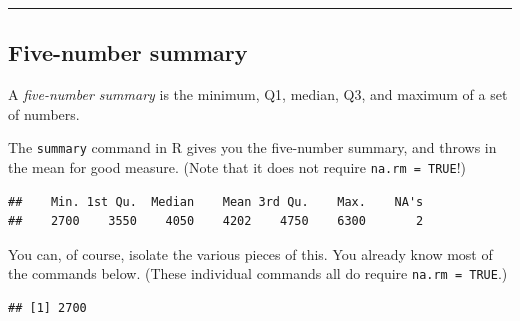 \documentclass[
]{book}
\newenvironment{Shaded}{\begin{snugshade}}{\end{snugshade}}
\newcommand{\AttributeTok}[1]{\textcolor[rgb]{0.77,0.63,0.00}{#1}}
\newcommand{\ConstantTok}[1]{\textcolor[rgb]{0.00,0.00,0.00}{#1}}
\newcommand{\FunctionTok}[1]{\textcolor[rgb]{0.00,0.00,0.00}{#1}}
\newcommand{\NormalTok}[1]{#1}
\newcommand{\SpecialCharTok}[1]{\textcolor[rgb]{0.00,0.00,0.00}{#1}}
\begin{document}
\begin{center}\rule{0.5\linewidth}{0.5pt}\end{center}

\hypertarget{numerical-five}{%
\subsection{Five-number summary}\label{numerical-five}}

A \emph{five-number summary} is the minimum, Q1, median, Q3, and maximum of a set of numbers.

The \texttt{summary} command in R gives you the five-number summary, and throws in the mean for good measure. (Note that it does not require \texttt{na.rm\ =\ TRUE}!)

\begin{Shaded}
\end{Shaded}

\begin{verbatim}
##    Min. 1st Qu.  Median    Mean 3rd Qu.    Max.    NA's 
##    2700    3550    4050    4202    4750    6300       2
\end{verbatim}

You can, of course, isolate the various pieces of this. You already know most of the commands below. (These individual commands all do require \texttt{na.rm\ =\ TRUE}.)

\begin{Shaded}
\end{Shaded}

\begin{verbatim}
## [1] 2700
\end{verbatim}

\begin{Shaded}
\end{Shaded}
\end{document}
